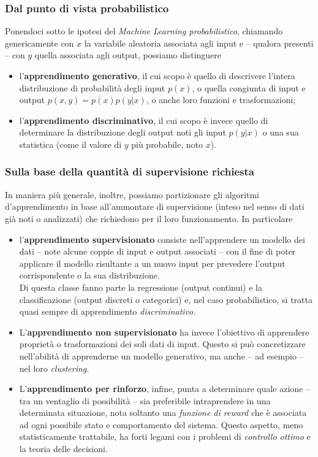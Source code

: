 \documentclass[a4paper, twoside]{article}
\begin{document}
\subsubsection{Dal punto di vista probabilistico}

Ponendoci sotto le ipotesi del \textit{Machine Learning probabilistico}, chiamando genericamente con $x$ la variabile aleatoria associata agli input e -- qualora presenti -- con $y$ quella associata agli output, possiamo distinguere

\begin{itemize}
	\item {l'\textbf{apprendimento generativo}, il cui scopo è quello di descrivere l'intera distribuzione di probabilità degli input $p(x)$, o quella congiunta di input e output $p(x,y) = p(x)p(y|x)$, o anche loro funzioni e trasformazioni;}
	\item {l'\textbf{apprendimento discriminativo}, il cui scopo è invece quello di determinare la distribuzione degli output noti gli input $p(y|x)$ o una sua statistica (come il valore di $y$ più probabile, noto $x$).}
\end{itemize}


\subsubsection{Sulla base della quantità di supervisione richiesta}

In maniera più generale, inoltre, possiamo partizionare gli algoritmi d'apprendimento in base all'ammontare di supervisione (inteso nel senso di dati già noti o analizzati) che richiedono per il loro funzionamento. In particolare

\begin{itemize}
	\item {l'\textbf{apprendimento supervisionato} consiste nell'apprendere un modello dei dati -- note alcune coppie di input e output associati -- con il fine di poter applicare il modello risultante a un nuovo input per prevedere l'output corrispondente o la sua distribuzione.\\
	Di questa classe fanno parte la regressione (output continui) e la classificazione (output discreti o categorici) e, nel caso probabilistico, si tratta quasi sempre di apprendimento \textit{discriminativo}.}

	\item {L'\textbf{apprendimento non supervisionato} ha invece l'obiettivo di apprendere proprietà o trasformazioni dei soli dati di input. Questo si può concretizzare nell'abilità di apprenderne un modello generativo, ma anche -- ad esempio -- nel loro \textit{clustering}.}

	\item {L'\textbf{apprendimento per rinforzo}, infine, punta a determinare quale azione -- tra un ventaglio di possibilità -- sia preferibile intraprendere in una determinata situazione, nota soltanto una \textit{funzione di reward} che è associata ad ogni possibile stato e comportamento del sistema. Questo aspetto, meno statisticamente trattabile, ha forti legami con i problemi di \textit{controllo ottimo} e la teoria delle decisioni.}
\end{itemize}
\end{document}
